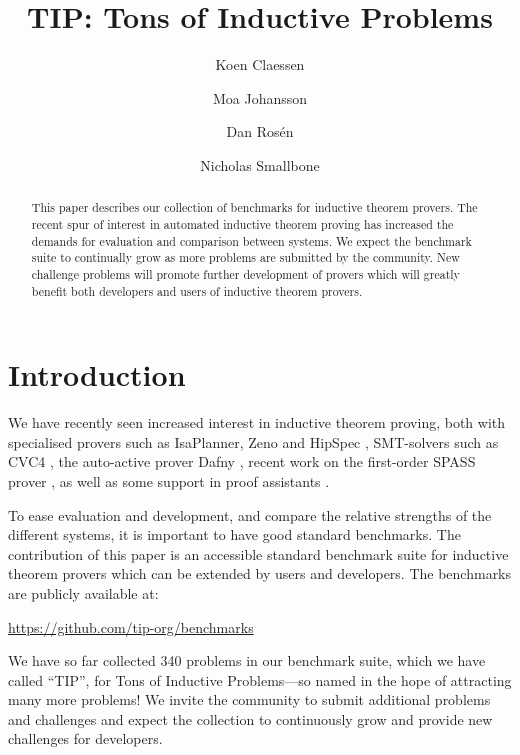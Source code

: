 \documentclass{llncs}
\begin{document}
\title{TIP: Tons of Inductive Problems}

\author{Koen Claessen \and Moa Johansson \and Dan Ros\'en \and Nicholas Smallbone}

\titlerunning{}

\maketitle

\begin{abstract} This paper describes our collection of
benchmarks for inductive theorem provers. 
The recent spur of 
interest in automated inductive theorem proving has 
increased the demands for evaluation and comparison between 
systems. 
We expect the benchmark suite to continually grow as more problems are 
submitted by the community. 
New challenge problems will promote 
further development of provers which will greatly benefit both 
developers and users of inductive theorem provers. 
\end{abstract}

\section{Introduction}

We have recently seen increased interest in inductive theorem 
proving, both with specialised provers such as IsaPlanner, Zeno 
and HipSpec \cite{hipspecCADE,dixon2007isaplanner,zeno}, 
SMT-solvers such as CVC4 \cite{cvc4}, the auto-active prover 
Dafny \cite{dafny}, recent work on the first-order SPASS prover 
\cite{SPASSInduction}, as well as some support in proof 
assistants \cite{hipster,acl2}.

To ease evaluation and development, and compare the relative 
strengths of the different systems, it is important to have good 
standard benchmarks. The contribution of this paper is an 
accessible standard benchmark suite for inductive theorem 
provers which can be extended by users and developers. The 
benchmarks are publicly available at:
\begin{center}
\url{https://github.com/tip-org/benchmarks}
\end{center}
We have so far collected 340 problems in our benchmark suite,
which we have called ``TIP'', for Tons of Inductive Problems---so
named in the hope of attracting many more problems! We invite the
community to submit additional problems and challenges and expect the
collection to continuously grow and provide new challenges for
developers.
\end{document}
